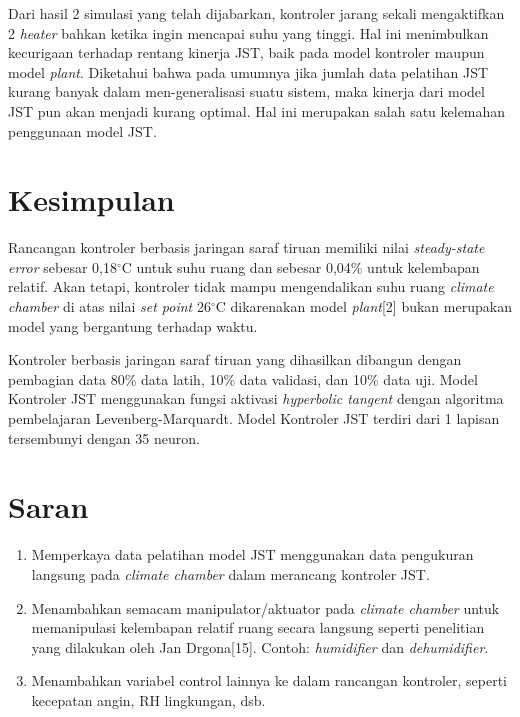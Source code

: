 \documentclass[a4paper,10pt]{article}
\newenvironment{body}{\begin{multicols}{2}}{\end{multicols}}
\begin{document}
\begin{body}
		Dari hasil 2 simulasi yang telah dijabarkan, kontroler jarang sekali mengaktifkan 2 \textit{heater} bahkan ketika ingin mencapai suhu yang tinggi. Hal ini menimbulkan kecurigaan terhadap rentang kinerja JST, baik pada model kontroler maupun model \textit{plant}. Diketahui bahwa pada umumnya jika jumlah data pelatihan JST kurang banyak dalam men-generalisasi suatu sistem, maka kinerja dari model JST pun akan menjadi kurang optimal. Hal ini merupakan salah satu kelemahan penggunaan model JST.\\
		\vspace{3em}
		
		\section{Kesimpulan}
		Rancangan kontroler berbasis jaringan saraf tiruan memiliki nilai \textit{steady-state error} sebesar 0,18$^\circ$C untuk suhu ruang dan sebesar 0,04\% untuk kelembapan relatif. Akan tetapi, kontroler tidak mampu mengendalikan suhu ruang \textit{climate chamber} di atas nilai \textit{set point} 26$^\circ$C dikarenakan model \textit{plant}[2] bukan merupakan model yang bergantung terhadap waktu.
		
		Kontroler berbasis jaringan saraf tiruan yang dihasilkan dibangun dengan pembagian data 80\% data latih, 10\% data validasi, dan 10\% data uji. Model Kontroler JST menggunakan fungsi aktivasi \textit{hyperbolic tangent} dengan algoritma	pembelajaran Levenberg-Marquardt. Model Kontroler JST terdiri dari 1 lapisan tersembunyi dengan 35 neuron.\\
		
		\section{Saran}
		\begin{enumerate}[nolistsep]
			\item Memperkaya data pelatihan model JST menggunakan data pengukuran langsung pada \textit{climate chamber} dalam merancang kontroler JST.
			\item Menambahkan semacam manipulator/aktuator pada \textit{climate chamber} untuk memanipulasi kelembapan relatif ruang secara langsung seperti penelitian yang dilakukan oleh Jan Drgona[15]. Contoh: \textit{humidifier} dan \textit{dehumidifier}.
			\item Menambahkan variabel control lainnya ke dalam rancangan kontroler, seperti kecepatan angin, RH lingkungan, dsb.
		\end{enumerate}
		\vspace{1em}
		

\end{body}
\end{document}
